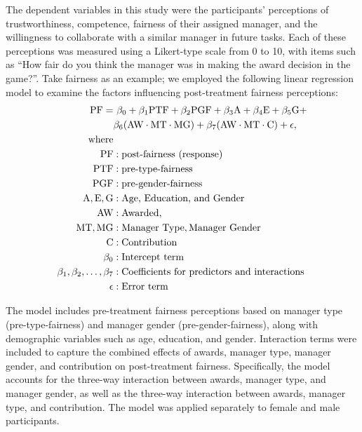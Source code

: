 \documentclass{article}
\begin{document}
{The dependent variables in this study were the participants' perceptions of trustworthiness, competence, fairness of their assigned manager, and the willingness to collaborate with a similar manager in future tasks. Each of these perceptions was measured using a Likert-type scale from 0 to 10, with items such as “How fair do you think the manager was in making the award decision in the game?”.
Take fairness as an example; we employed the following linear regression model to examine the factors influencing post-treatment fairness perceptions:  
\begin{equation}
\begin{split}
\text{PF} = &\ \beta_0 + \beta_1 \text{PTF} + \beta_2 \text{PGF} + \beta_3 \text{A} + \beta_4 \text{E} + \beta_5 \text{G} + \notag \\
&\beta_6 (\text{AW} \cdot \text{MT} \cdot \text{MG}) +
\beta_7 (\text{AW} \cdot \text{MT} \cdot \text{C}) + \epsilon,
\label{eq:post_fairness}\\
\text{where}\\
\text{PF} & : \text{post-fairness (response)} \\
\text{PTF} & : \text{pre-type-fairness} \\
\text{PGF} & : \text{pre-gender-fairness} \\
\text{A}, \text{E}, \text{G} & : \text{Age, Education, and Gender} \\
\text{AW} &: \text{Awarded, } \\
\text{MT}, \text{MG} &: \text{Manager Type}, \text{Manager Gender}\\
\text{C} &: \text{Contribution}\\ 
\beta_0 & : \text{Intercept term} \\
\beta_1, \beta_2, \ldots, \beta_7 & : \text{Coefficients for predictors and interactions} \\
\epsilon & : \text{Error term}
\end{split}
\end{equation}

The model includes pre-treatment fairness perceptions based on manager type (pre-type-fairness) and manager gender (pre-gender-fairness), along with demographic variables such as age, education, and gender. Interaction terms were included to capture the combined effects of awards, manager type, manager gender, and contribution on post-treatment fairness. Specifically, the model accounts for the three-way interaction between awards, manager type, and manager gender, as well as the three-way interaction between awards, manager type, and contribution.
The model was applied separately to female and male participants.


}
\end{document}
